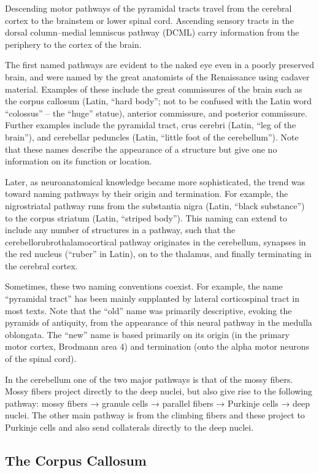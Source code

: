 Descending motor pathways of the pyramidal tracts travel from the cerebral cortex to the brainstem or lower spinal cord. Ascending sensory tracts in the dorsal column--medial lemniscus pathway (DCML) carry information from the periphery to the cortex of the brain.

The first named pathways are evident to the naked eye even in a poorly preserved brain, and were named by the great anatomists of the Renaissance using cadaver material. Examples of these include the great commissures of the brain such as the corpus callosum (Latin, ``hard body''; not to be confused with the Latin word ``colossus'' -- the ``huge'' statue), anterior commissure, and posterior commissure. Further examples include the pyramidal tract, crus cerebri (Latin, ``leg of the brain''), and cerebellar peduncles (Latin, ``little foot of the cerebellum''). Note that these names describe the appearance of a structure but give one no information on its function or location.

Later, as neuroanatomical knowledge became more sophisticated, the trend was toward naming pathways by their origin and termination. For example, the nigrostriatal pathway runs from the substantia nigra (Latin, ``black substance'') to the corpus striatum (Latin, ``striped body''). This naming can extend to include any number of structures in a pathway, such that the cerebellorubrothalamocortical pathway originates in the cerebellum, synapses in the red nucleus (``ruber'' in Latin), on to the thalamus, and finally terminating in the cerebral cortex.

Sometimes, these two naming conventions coexist. For example, the name ``pyramidal tract'' has been mainly supplanted by lateral corticospinal tract in most texts. Note that the ``old'' name was primarily descriptive, evoking the pyramids of antiquity, from the appearance of this neural pathway in the medulla oblongata. The ``new'' name is based primarily on its origin (in the primary motor cortex, Brodmann area 4) and termination (onto the alpha motor neurons of the spinal cord).

In the cerebellum one of the two major pathways is that of the mossy fibers. Mossy fibers project directly to the deep nuclei, but also give rise to the following pathway: mossy fibers → granule cells → parallel fibers → Purkinje cells → deep nuclei. The other main pathway is from the climbing fibers and these project to Purkinje cells and also send collaterals directly to the deep nuclei.

\hypertarget{the-corpus-callosum}{%
\subsection{The Corpus Callosum}\label{the-corpus-callosum}}


